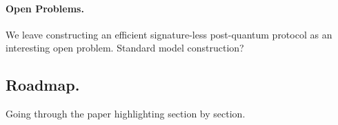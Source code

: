 \paragraph{Open Problems.}
We leave constructing an efficient signature-less post-quantum \introGAKE protocol as an interesting open problem. 
Standard model construction?


\subsection{Roadmap.}
Going through the paper highlighting section by section.
